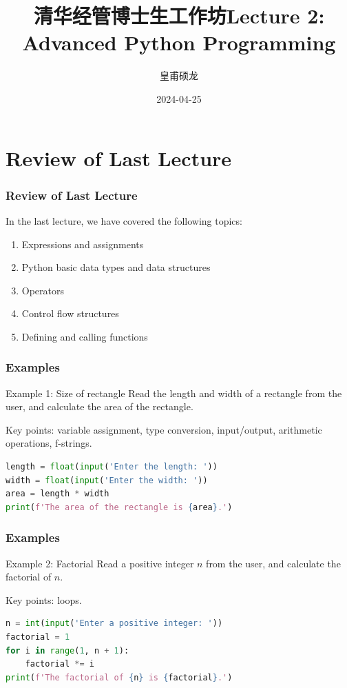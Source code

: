 \documentclass[beamer, en, version=2.0]{huangfusl-template}
\title[Lecture 2: Advanced Python Programming]{\LARGE{清华经管博士生工作坊}\newline\newline \large{Lecture 2: Advanced Python Programming}}
\author{皇甫硕龙}
\date{2024-04-25}
\begin{document}
    \begin{frame}[fragile]
        \maketitle
    \end{frame}
    \section{Review of Last Lecture}
    \begin{frame}
        \frametitle{Review of Last Lecture}

        In the last lecture, we have covered the following topics:

        \begin{enumerate}
            \item Expressions and assignments
            \item Python basic data types and data structures
            \item Operators
            \item Control flow structures
            \item Defining and calling functions
        \end{enumerate}
    \end{frame}
    \begin{frame}[fragile]
        \frametitle{Examples}

        \begin{block}{Example 1: Size of rectangle}
            Read the length and width of a rectangle from the user, and calculate the area of the rectangle.
        \end{block}

        Key points: variable assignment, type conversion, input/output, arithmetic operations, f-strings.

        \pause

\begin{lstlisting}[language=python]
length = float(input('Enter the length: '))
width = float(input('Enter the width: '))
area = length * width
print(f'The area of the rectangle is {area}.')
\end{lstlisting}
    \end{frame}
    \begin{frame}[fragile]
        \frametitle{Examples}

        \begin{block}{Example 2: Factorial}
            Read a positive integer $n$ from the user, and calculate the factorial of $n$.
        \end{block}

        Key points: loops.

        \pause

\begin{lstlisting}[language=python]
n = int(input('Enter a positive integer: '))
factorial = 1
for i in range(1, n + 1):
    factorial *= i
print(f'The factorial of {n} is {factorial}.')
\end{lstlisting}

    \end{frame}
\end{document}
